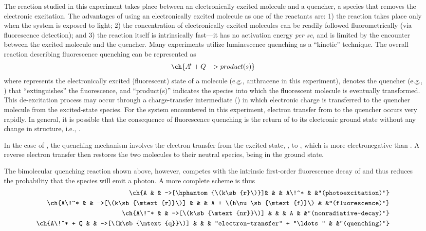 The reaction studied in this experiment takes place between an electronically excited molecule and a quencher, a species that removes the electronic excitation. 
The advantages of using an electronically excited molecule as one of the reactants are: 
1) the reaction takes place only when the system is exposed to light; 
2) the concentration of electronically excited molecules can be readily followed fluorometrically (via fluorescence detection); and 
3) the reaction itself is intrinsically fast---it has no activation energy \emph{per se}, and is limited by the encounter between the excited molecule and the quencher. 
Many experiments utilize luminescence quenching as a ``kinetic'' technique. 
The overall reaction describing fluorescence quenching can be represented as
\[
	\ch{A\!^* + Q -> product(s)}
\]
where  represents the electronically excited (fluorescent) state of a molecule (e.g., anthracene in this experiment),  denotes the quencher (e.g., ) that ``extinguishes'' the  fluorescence, and ``product(s)'' indicates the species into which the fluorescent molecule is eventually transformed. 
This de-excitation process may occur through a charge-transfer intermediate () in which electronic charge is transferred to the quencher molecule from the excited-state species.
For the system encountered in this experiment, electron transfer from  to the quencher occurs very rapidly. 
In general, it is possible that the consequence of fluorescence quenching is the return of  to its electronic ground state without any change in structure, i.e., .

In the case of , the quenching mechanism involves the electron transfer from the excited state, , to , which is more electronegative than . 
A reverse electron transfer then restores the two molecules to their neutral species,  being in the ground state. 

The bimolecular quenching reaction shown above, however, competes with the intrinsic first-order fluorescence decay of  and thus reduces the probability that the  species will emit a photon. A more complete scheme is thus
\begin{align*}
	\ch{A 			&	& ->[\hphantom{\(k\sb{r}\)}]&	&	&	A\!^*							&	&"(photoexcitation)"} 	\\
	\ch{A\!^* 		&	& ->[\(k\sb{\mtext{r}}\)]	&	&	&	A + \(h\nu\sb{\mtext{f}}\)		&	&"(fluorescence)"} 		\\
	\ch{A\!^* 		&	& ->[\(k\sb{\mtext{nr}}\)]	&	&	&	A								&	&"(nonradiative~decay)"}\\
	\ch{A\!^* + Q	&	& ->[\(k\sb{\mtext{q}}\)]	&	&	&	"electron~transfer" + "\ldots"	&	&"(quenching)"}
\end{align*}


